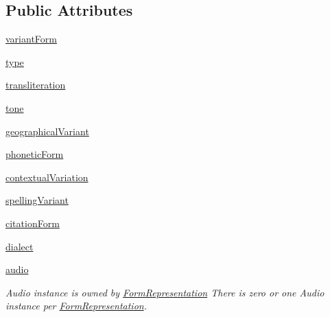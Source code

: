 \subsection*{Public Attributes}
\begin{DoxyCompactItemize}
\item 
\hyperlink{classlmf_1_1src_1_1core_1_1form__representation_1_1_form_representation_ab271a76ed31e46ce4c1e66fad2651a73}{variant\+Form}
\item 
\hyperlink{classlmf_1_1src_1_1core_1_1form__representation_1_1_form_representation_a26785ac6e2bf05ebefb60d1c019db55d}{type}
\item 
\hyperlink{classlmf_1_1src_1_1core_1_1form__representation_1_1_form_representation_ab192387108c3c4e780297d1b409d5eff}{transliteration}
\item 
\hyperlink{classlmf_1_1src_1_1core_1_1form__representation_1_1_form_representation_a2cfea0271f8abfcffb74afb7641ef4df}{tone}
\item 
\hyperlink{classlmf_1_1src_1_1core_1_1form__representation_1_1_form_representation_a7d080181b73f2c03d3a2cf65a97be169}{geographical\+Variant}
\item 
\hyperlink{classlmf_1_1src_1_1core_1_1form__representation_1_1_form_representation_a50b914930f083c55e70e805a2430e88d}{phonetic\+Form}
\item 
\hyperlink{classlmf_1_1src_1_1core_1_1form__representation_1_1_form_representation_a1068952fddde59f78e8a56b785b0bcbf}{contextual\+Variation}
\item 
\hyperlink{classlmf_1_1src_1_1core_1_1form__representation_1_1_form_representation_aef2857854ecb2ca02c7ede104b617505}{spelling\+Variant}
\item 
\hyperlink{classlmf_1_1src_1_1core_1_1form__representation_1_1_form_representation_a70151ff258dea274006e4976818847a3}{citation\+Form}
\item 
\hyperlink{classlmf_1_1src_1_1core_1_1form__representation_1_1_form_representation_ad19ad7a519048bc71ff0d0df2c888621}{dialect}
\item 
\hyperlink{classlmf_1_1src_1_1core_1_1form__representation_1_1_form_representation_ac13f0605619b9bdc6b921ae19b39c068}{audio}
\begin{DoxyCompactList}\small\item\em Audio instance is owned by \hyperlink{classlmf_1_1src_1_1core_1_1form__representation_1_1_form_representation}{Form\+Representation} There is zero or one Audio instance per \hyperlink{classlmf_1_1src_1_1core_1_1form__representation_1_1_form_representation}{Form\+Representation}. \end{DoxyCompactList}\item 

\end{DoxyCompactItemize}
